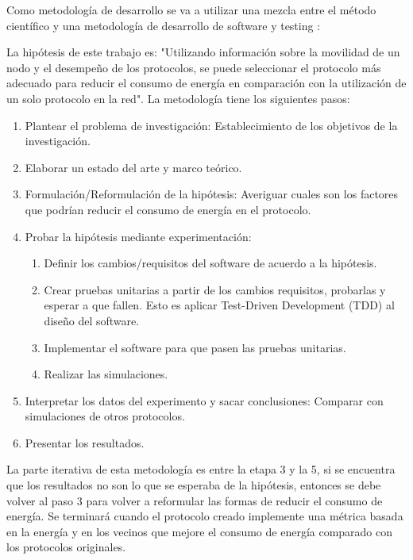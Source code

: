 Como metodología de desarrollo se va a utilizar una mezcla entre el método
científico y una metodología de desarrollo de software y testing
\cite{hernandez_sampieri_metodologiinvestigacion_2010}:

La hipótesis de este trabajo es: "Utilizando información sobre la movilidad de
un nodo y el desempeño de los protocolos, se puede seleccionar el protocolo más
adecuado para reducir el consumo de energía en comparación con la utilización de
un solo protocolo en la red". La metodología tiene los siguientes pasos:



\begin{enumerate}
    \item Plantear el problema de investigación: Establecimiento de los
      objetivos de la investigación.
    \item Elaborar un estado del arte y marco teórico.
    \item Formulación/Reformulación de la hipótesis: Averiguar cuales son los
        factores que podrían reducir el consumo de energía en el protocolo.
    \item Probar la hipótesis mediante experimentación:
        \begin{enumerate}
            \item Definir los cambios/requisitos del software de acuerdo a la
                hipótesis.
            \item Crear pruebas unitarias a partir de los cambios requisitos,
                probarlas y esperar a que fallen. Esto es aplicar Test-Driven
                Development \cite{ble_jurado_diseno_2010} (TDD) al diseño del software.
            \item Implementar el software para que pasen las pruebas unitarias.
            \item Realizar las simulaciones.
        \end{enumerate}
    \item Interpretar los datos del experimento y sacar conclusiones: Comparar
        con simulaciones de otros protocolos.
    \item Presentar los resultados.
\end{enumerate}



La parte iterativa de esta metodología es entre la etapa 3 y la 5, si se
encuentra que los resultados no son lo que se esperaba de la hipótesis, entonces
se debe volver al paso 3 para volver a reformular las formas de reducir el
consumo de energía. Se terminará cuando el protocolo creado implemente una
métrica basada en la energía y en los vecinos que mejore el consumo de energía
comparado con los protocolos originales.


